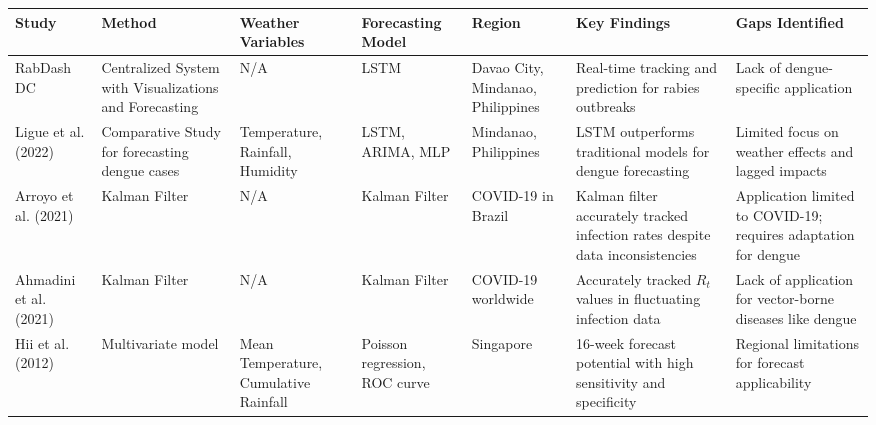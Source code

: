 \begin{table}[]
	\begin{tabular}{|l|l|l|l|l|l|l|}
		\hline
		Study                  & Method                                                 & Weather Variables                     & Forecasting Model             & Region                            & Key Findings                                                                  & Gaps Identified                                                 \\ \hline
		RabDash DC             & Centralized System with Visualizations and Forecasting & N/A                                   & LSTM                          & Davao City, Mindanao, Philippines & Real-time tracking and prediction for rabies outbreaks                        & Lack of dengue-specific application                             \\ \hline
		Ligue et al. (2022)    & Comparative Study for forecasting dengue cases         & Temperature, Rainfall, Humidity       & LSTM, ARIMA, MLP              & Mindanao, Philippines             & LSTM outperforms traditional models for dengue forecasting                    & Limited focus on weather effects and lagged impacts             \\ \hline
		Arroyo et al. (2021)   & Kalman Filter                                          & N/A                                   & Kalman Filter                 & COVID-19 in Brazil                & Kalman filter accurately tracked infection rates despite data inconsistencies & Application limited to COVID-19; requires adaptation for dengue \\ \hline
		Ahmadini et al. (2021) & Kalman Filter                                          & N/A                                   & Kalman Filter                 & COVID-19 worldwide                & Accurately tracked $R_t$ values in fluctuating infection data                 & Lack of application for vector-borne diseases like dengue       \\ \hline
		Hii et al. (2012)      & Multivariate model                                     & Mean Temperature, Cumulative Rainfall & Poisson regression, ROC curve & Singapore                         & 16-week forecast potential with high sensitivity and specificity              & Regional limitations for forecast applicability                 \\ \hline
	\end{tabular}
\end{table}













